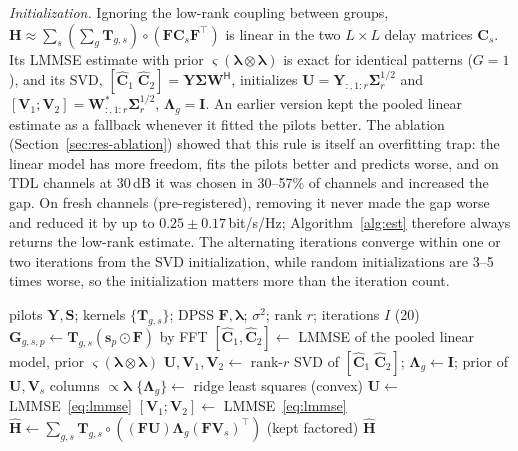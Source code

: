 \emph{Initialization.} Ignoring the low-rank coupling between groups, $\bm H\approx\sum_s(\sum_g\bm T_{g,s})\circ(\bm F\bm C_s\bm F^{\top})$
is linear in the two $L\times L$ delay matrices $\bm C_s$. Its LMMSE estimate with prior
$\varsigma(\bm\lambda\otimes\bm\lambda)$ is exact for identical patterns ($G=1$), and its SVD,
$[\hat{\bm C}_1\;\hat{\bm C}_2]=\bm Y\bm\Sigma\bm W^{\mathsf H}$, initializes
$\bm U=\bm Y_{:,1:r}\bm\Sigma_r^{1/2}$ and $[\bm V_1;\bm V_2]=\bm W^{*}_{:,1:r}\bm\Sigma_r^{1/2}$, $\bm\Lambda_g=\bm I$.
An earlier version kept the pooled linear estimate as a fallback whenever it fitted the pilots
better. The ablation (Section~\ref{sec:res-ablation}) showed that this rule is itself an overfitting trap: the linear
model has more freedom, fits the pilots better and predicts worse, and on TDL channels at 30\,dB it was chosen in
30--57\% of channels and increased the gap. On fresh channels (pre-registered), removing it never made the gap worse
and reduced it by up to $0.25\pm0.17$\,bit/s/Hz; Algorithm~\ref{alg:est} therefore always returns the low-rank
estimate. The alternating iterations converge within one or two iterations from the SVD initialization, while random
initializations are 3--5 times worse, so the initialization matters more than the iteration count.

\begin{algorithm}[!htbp]
\caption{Timing-only low-rank estimation}\label{alg:est}
\begin{algorithmic}[1]
\Require pilots $\bm Y,\bm S$; kernels $\{\bm T_{g,s}\}$; DPSS $\bm F,\bm\lambda$; $\sigma^2$; rank $r$; iterations $I$ (20)
\State $\bm G_{g,s,p}\gets\bm T_{g,s}(\bm s_p\odot\bm F)$ by FFT 
\State $[\hat{\bm C}_1,\hat{\bm C}_2]\gets$ LMMSE of the pooled linear model, prior $\varsigma(\bm\lambda\otimes\bm\lambda)$
\State $\bm U,\bm V_1,\bm V_2\gets$ rank-$r$ SVD of $[\hat{\bm C}_1\;\hat{\bm C}_2]$; $\bm\Lambda_g\gets\bm I$; prior of $\bm U,\bm V_s$ columns $\propto\bm\lambda$
  \State $\{\bm\Lambda_g\}\gets$ ridge least squares (convex) 
  \State $\bm U\gets$ LMMSE~\eqref{eq:lmmse} 
  \State $[\bm V_1;\bm V_2]\gets$ LMMSE~\eqref{eq:lmmse} 
\EndFor
\State $\hat{\bm H}\gets\sum_{g,s}\bm T_{g,s}\circ((\bm F\bm U)\bm\Lambda_g(\bm F\bm V_s)^{\top})$ (kept factored)
\State \Return $\hat{\bm H}$ 
\end{algorithmic}
\end{algorithm}


